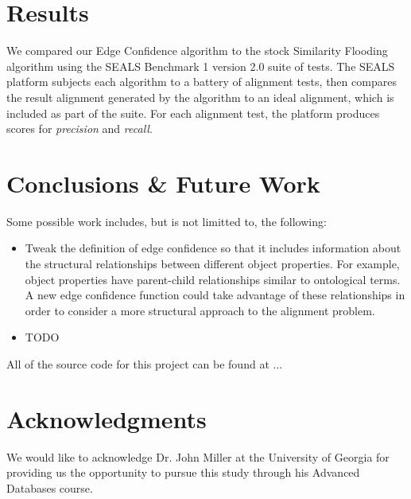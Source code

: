 \documentclass[letterpaper,twocolumn,12pt]{article}
\begin{document}
\section{Results}
\label{sec:results}
We compared our Edge Confidence algorithm to the stock Similarity Flooding algorithm
using the SEALS Benchmark 1 version 2.0 suite of tests. The SEALS platform subjects
each algorithm to a battery of alignment tests, then compares the result alignment
generated by the algorithm to an ideal alignment, which is included as part of the suite.
For each alignment test, the platform produces scores for \textit{precision} and \textit{recall}.

\section{Conclusions \& Future Work}
\label{sec:conclusions}


Some possible work includes, but is not limitted to, the following:

\begin{itemize}
\item Tweak the definition of edge confidence so that it includes information about the structural relationships between different object properties.
For example, object properties have parent-child relationships similar to ontological terms.
A new edge confidence function could take advantage of these relationships in order to consider a more structural approach to the alignment problem.
\item TODO
\end{itemize}

All of the source code for this project can be found at ...

\section*{Acknowledgments}

We would like to acknowledge Dr. John Miller at the University of Georgia for providing us the opportunity to pursue this study through his Advanced Databases course. 

%

 
\end{document}
